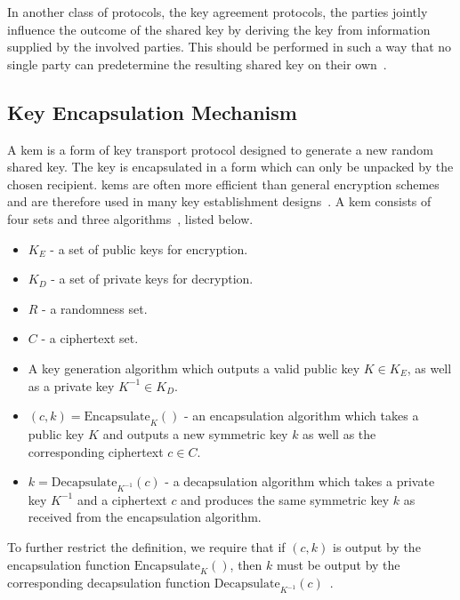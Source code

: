 In another class of protocols, the key agreement protocols, the parties jointly influence the outcome of the shared key by deriving the key from information supplied by the involved parties. This should be performed in such a way that no single party can predetermine the resulting shared key on their own~\cite{boyd2020}.

\subsection{Key Encapsulation Mechanism}

A \acrfull{kem} is a form of key transport protocol designed to generate a new random shared key. The key is encapsulated in a form which can only be unpacked by the chosen recipient. \glspl{kem} are often more efficient than general encryption schemes and are therefore used in many key establishment designs~\cite{boyd2020}. A \gls{kem} consists of four sets and three algorithms~\cite{boyd2020}, listed below.

\begin{itemize}
    \item $K_E$ - a set of public keys for encryption.
    \item $K_D$ - a set of private keys for decryption.
    \item $R$ - a randomness set.
    \item $C$ - a ciphertext set.
\end{itemize}

\begin{itemize}
    \item A key generation algorithm which outputs a valid public key $K\in K_E$, as well as a private key $K^{-1}\in K_D$.
    \item $(c,k)=\text{Encapsulate}_K()$ - an encapsulation algorithm which takes a public key $K$ and outputs a new symmetric key $k$ as well as the corresponding ciphertext $c\in C$.
    \item $k=\text{Decapsulate}_{K^{-1}}(c)$ - a decapsulation algorithm which takes a private key $K^{-1}$ and a ciphertext $c$ and produces the same symmetric key $k$ as received from the encapsulation algorithm.
\end{itemize}

\noindent To further restrict the definition, we require that if $(c,k)$ is output by the encapsulation function $\text{Encapsulate}_K()$, then $k$ must be output by the corresponding decapsulation function $\text{Decapsulate}_{K^{-1}}(c)$~\cite{boyd2020}.

